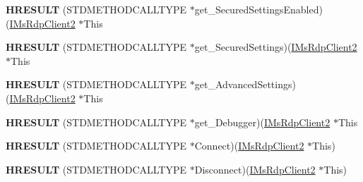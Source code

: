 \begin{DoxyCompactItemize}
\item 
\mbox{\label{struct_m_s_t_s_c_lib_1_1_i_ms_rdp_client2_vtbl_a268f57ee43a13310a3c8cd2c759f513a}} 
{\bfseries H\+R\+E\+S\+U\+LT} (S\+T\+D\+M\+E\+T\+H\+O\+D\+C\+A\+L\+L\+T\+Y\+PE $\ast$get\+\_\+\+Secured\+Settings\+Enabled)(\hyperlink{interface_m_s_t_s_c_lib_1_1_i_ms_rdp_client2}{I\+Ms\+Rdp\+Client2} $\ast$This
\item 
\mbox{\label{struct_m_s_t_s_c_lib_1_1_i_ms_rdp_client2_vtbl_a4fbf7081f6851b0d519920badc4e3c45}} 
{\bfseries H\+R\+E\+S\+U\+LT} (S\+T\+D\+M\+E\+T\+H\+O\+D\+C\+A\+L\+L\+T\+Y\+PE $\ast$get\+\_\+\+Secured\+Settings)(\hyperlink{interface_m_s_t_s_c_lib_1_1_i_ms_rdp_client2}{I\+Ms\+Rdp\+Client2} $\ast$This
\item 
\mbox{\label{struct_m_s_t_s_c_lib_1_1_i_ms_rdp_client2_vtbl_a1d960688691c618b618d4e63bb50cf85}} 
{\bfseries H\+R\+E\+S\+U\+LT} (S\+T\+D\+M\+E\+T\+H\+O\+D\+C\+A\+L\+L\+T\+Y\+PE $\ast$get\+\_\+\+Advanced\+Settings)(\hyperlink{interface_m_s_t_s_c_lib_1_1_i_ms_rdp_client2}{I\+Ms\+Rdp\+Client2} $\ast$This
\item 
\mbox{\label{struct_m_s_t_s_c_lib_1_1_i_ms_rdp_client2_vtbl_a070083bab48fb47c23398bc61a52b7f7}} 
{\bfseries H\+R\+E\+S\+U\+LT} (S\+T\+D\+M\+E\+T\+H\+O\+D\+C\+A\+L\+L\+T\+Y\+PE $\ast$get\+\_\+\+Debugger)(\hyperlink{interface_m_s_t_s_c_lib_1_1_i_ms_rdp_client2}{I\+Ms\+Rdp\+Client2} $\ast$This
\item 
\mbox{\label{struct_m_s_t_s_c_lib_1_1_i_ms_rdp_client2_vtbl_a7a2e894a0aa838a7486049eabd90eca6}} 
{\bfseries H\+R\+E\+S\+U\+LT} (S\+T\+D\+M\+E\+T\+H\+O\+D\+C\+A\+L\+L\+T\+Y\+PE $\ast$Connect)(\hyperlink{interface_m_s_t_s_c_lib_1_1_i_ms_rdp_client2}{I\+Ms\+Rdp\+Client2} $\ast$This)
\item 
\mbox{\label{struct_m_s_t_s_c_lib_1_1_i_ms_rdp_client2_vtbl_af8b0f9b6a3e5143c8ec5798d5433d3e1}} 
{\bfseries H\+R\+E\+S\+U\+LT} (S\+T\+D\+M\+E\+T\+H\+O\+D\+C\+A\+L\+L\+T\+Y\+PE $\ast$Disconnect)(\hyperlink{interface_m_s_t_s_c_lib_1_1_i_ms_rdp_client2}{I\+Ms\+Rdp\+Client2} $\ast$This)

\end{DoxyCompactItemize}

